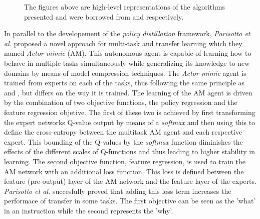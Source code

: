 \documentclass{article}
\begin{document}
\begin{figure}[!ht]
     \hfill
     \caption{The figures above are high-level representations of the algorithms presented and were borrowed from \citep{Teh2017Distral:Learning} and \citep{YinKnowledgeReplay} respectively.}
     \label{fig:high -level}
\end{figure}
\newline
In parallel to the developement of the \textit{policy distillation} framework, \textit{Parisotto et al.} \citep{Parisotto2015Actor-Mimic:Learning} proposed a novel approach for multi-task and transfer learning which they named \textit{Actor-mimic} (AM). This autonomous agent is capable of learning how to behave in multiple tasks simultaneously while generalizing its knowledge to new domains by means of model compression techniques. The \textit{Actor-mimic} agent is trained from experts on each of the tasks, thus following the same principle as \citep{RusuPOLICYDISTILLATION} and \citep{Teh2017Distral:Learning}, but differs on the way it is trained. 
The learning of the AM agent is driven by the combination of two objective functions, the policy regression and the feature regression objetive. The first of these two is achieved by first transforming the expert networks Q-value output by means of a \textit{softmax} and then using this to define the cross-entropy between the multitask AM agent and each respective expert. This bounding of the Q-values by the \textit{softmax} function diminishes the effects of the different scales of Q-functions and thus leading to higher stability in learning. The second objective function, feature regression, is used to train the AM network with an additional loss function. This loss is defined between the feature (pre-output) layer of the AM network and the feature layer of the experts. \textit{Parisotto et al.} succesfully proved that adding this loss term increases the performace of transfer in some tasks. The first objective can be seen as the 'what' in an instruction while the second represents the 'why'.\\ 
\end{document}

